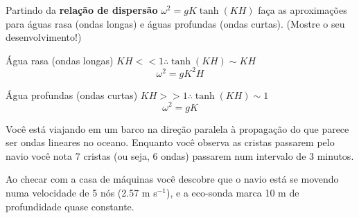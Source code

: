 \documentclass[letterpaper,portuguese,12pt,pdftex]{exam}
\begin{document}
\begin{questions}
\question[4]
Partindo da {\bf relação de dispersão} $\omega^2 = gK\tanh(KH)$ faça as
aproximações para águas rasa (ondas longas) e águas profundas (ondas
curtas). (Mostre o seu desenvolvimento!)

\begin{solution}
\raggedright
      Água rasa (ondas longas) $KH << 1 \therefore \tanh(KH) \sim KH$\\
      \[
        \omega^2 = gK^2H
      \]

      Água profundas (ondas curtas) $KH >> 1 \therefore \tanh(KH) \sim 1$\\
      \[
        \omega^2 = gK
      \]
  \end{solution}

\question
Você está viajando em um barco na direção paralela à propagação do que parece
ser ondas lineares no oceano.  Enquanto você observa as cristas passarem pelo
navio você nota 7 cristas (ou seja, 6 ondas) passarem num intervalo de 3
minutos.

Ao checar com a casa de máquinas você descobre que o navio está se movendo
numa velocidade de 5 nós (2.57 m s$^{-1}$), e a eco-sonda marca 10 m de profundidade
quase constante.

\end{questions}
\end{document}
